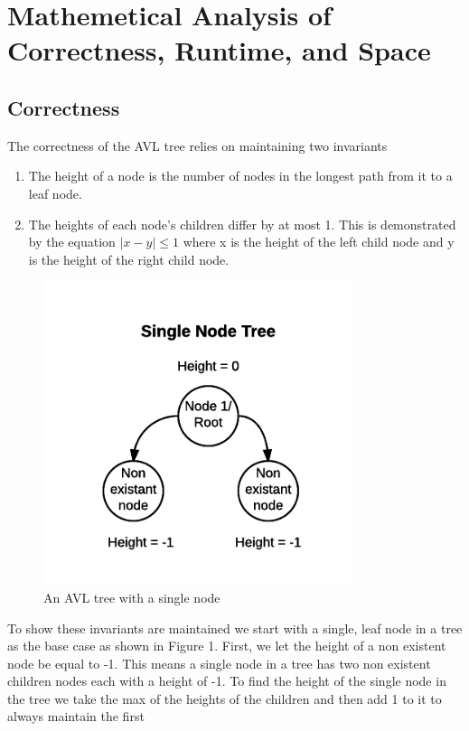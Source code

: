 \documentclass[12pt]{article}
\begin{document}
\section*{Mathemetical Analysis of Correctness, Runtime, and Space}

\subsection*{Correctness}
The correctness of the AVL tree relies on maintaining two invariants
\begin{enumerate}
  \item The height of a node is the number of nodes in the longest path from it
  to a leaf node.
  \item The heights of each node's children differ by at most 1.  This is
  demonstrated by the equation $|x-y| \le 1$ where x is the height of the left
  child node and y is the height of the right child node.
\end{enumerate}
\begin{figure}[h]
\caption{An AVL tree with a single node}
\includegraphics[width=9cm]{single_node_tree.png}
\centering
\end{figure}
\noindent
To show these invariants are maintained we start with a single, leaf node in a
tree as the base case as shown in Figure 1.  First, we let the height of a non
existent node be equal to -1.
This means a single node in a tree has two non existent children nodes each
with a height of -1.  To find the height of the single node in the tree we take the max of the
heights of the children and then add 1 to it to always maintain the first
\end{document}
